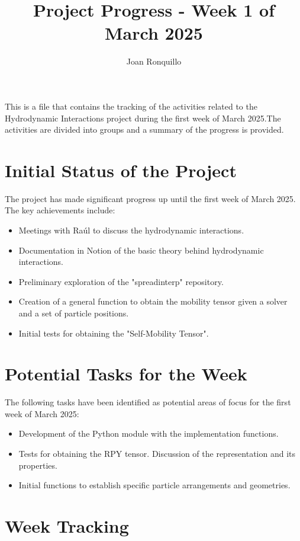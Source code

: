 \documentclass{article}
\begin{document}
\author{Joan Ronquillo}

\title{Project Progress - Week 1 of March 2025}
\maketitle

This is a file that contains the tracking of the activities related to the Hydrodynamic
Interactions project during the first week of March 2025.The activities are divided into
groups and a summary of the progress is provided.

\section{Initial Status of the Project}
The project has made significant progress up until the first week of March 2025. The key achievements include:

\begin{itemize}
    \item Meetings with Raúl to discuss the hydrodynamic interactions.
    \item Documentation in Notion of the basic theory behind hydrodynamic interactions.
    \item Preliminary exploration of the "spreadinterp" repository.
    \item Creation of a general function to obtain the mobility tensor given a solver and a set of particle positions.
    \item Initial tests for obtaining the "Self-Mobility Tensor".
\end{itemize}

\section{Potential Tasks for the Week}
The following tasks have been identified as potential areas of focus for the first week of March 2025:
\begin{itemize}
    \item Development of the Python module with the implementation functions.
    \item Tests for obtaining the RPY tensor. Discussion of the representation and its properties.
    \item Initial functions to establish specific particle arrangements and geometries.
\end{itemize}

\section{Week Tracking}
\end{document}
